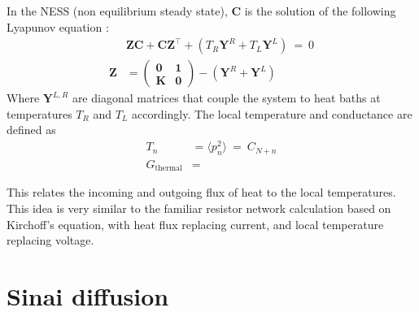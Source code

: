 In the NESS (non equilibrium steady state), $\mathbf{C}$ 
is the solution of the following Lyapunov equation \cite{bodyfelt_unpub,zheng,zheng_heat_2011,bhatia_how_1997}:
%
\begin{align}
&\mathbf{Z}\mathbf{C} + \mathbf{C}\mathbf{Z}^\intercal + (T_R\mathbf{Y}^R+T_L\mathbf{Y}^L) \ =\  0\\
\mathbf{Z} &= 
              \begin{pmatrix} 
                \mathbf{0} & \mathbf{1} \\
                \mathbf{K} & \mathbf{0} 
              \end{pmatrix} -(\mathbf{Y}^R+\mathbf{Y}^L)
\end{align}
%
Where $\mathbf{Y}^{L,R}$ are diagonal matrices that couple
the system to heat baths at temperatures $T_R$ and $T_L$ accordingly.
%
The local temperature and conductance are defined as
\begin{align}
T_n &= \langle p_n^2 \rangle \ = \ C_{N+n} \\
G_{\textrm{thermal}} &= 
\end{align}

This relates the incoming and outgoing flux of heat 
to the local temperatures. This idea is very similar
to the familiar resistor network calculation based on Kirchoff's equation, with 
heat flux replacing current, and local temperature replacing voltage. 
 

\begin{comment}
\section{Banded matrices spectrum}


For wide bandwidth and uncorrelated matrix elements, the high eigenvalues
should follow the Wigner semicircle law ($g(\lambda) = \frac{2}{\pi R^2}\sqrt{R^2-\lambda^2}$)
\cite{erdos_local_2012,fyodorov_scaling_1991,wigner_characteristic_1955}. However,
the low eigenvalues can still follow other rules, allowing for a transition
between diffusion and subdiffusion.
\end{comment}




\section{Sinai diffusion}\label{sec:sinai}




